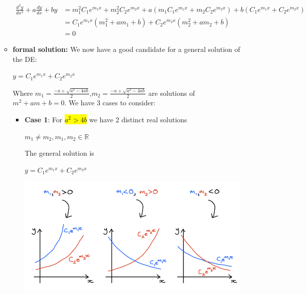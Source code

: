 \documentclass{article}
\begin{document}
\begin{enumerate}
\begin{itemize}
          \begin{align*}
            \frac{d^2 y}{dx^2} + a \frac{dy}{dx} + by &= m_1^2 C_1 e^{m_1 x} + m_2^2 C_2 e^{m_2 x} + a \left( m_1 C_1 e^{m_1 x} + m_2 C_2 e^{m_2 x} \right) + b \left( C_1 e^{m_1 x} + C_2 e^{m_2 x} \right) \\
            &= C_1 e^{m_1 x} \left( m_1^2 + a m_1 + b \right) + C_2 e^{m_2 x} \left( m_2^2 + a m_2 + b \right) \\
            &= 0
          \end{align*}


          \item \textbf{formal solution:} 
            We now have a good candidate for a general solution of the DE:
            \begin{center}
              $y =C_1e^{m_1x} + C_2e^{m_2x}$ 
            \end{center}
            Where $m_1 = \frac{-a + \sqrt{a^2-4ab}}{2}$,$m_2 = \frac{-a + \sqrt{a^2-4ab}}{2}$ are solutions of $m^2 + am +b = 0$. We have 3 cases to consider:



            \begin{itemize}
                \item \textbf{Case 1}: For \hl{$a^2 > 4b$} we have 2 distinct real solutions
                \begin{center}
                  $m_1 \neq m_2, m_1,m_2 \in \mathbb{R}$
                \end{center}
                The general solution is 
                \begin{center}
                  $y =C_1e^{m_1x} + C_2e^{m_2x}$
                \end{center}


                \includegraphics[width=\linewidth]{Graphs/w5_1.png}



\end{itemize}
\end{itemize}
\end{enumerate}
\end{document}
